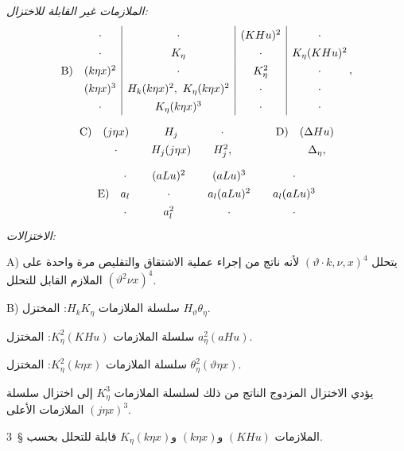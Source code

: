 \documentclass[11pt]{article}
\providecommand{\A}{\Delta}
\begin{document}
\noindent\emph{الملازمات غير القابلة للاختزال:}
\[
\renewcommand{\arraystretch}{1.35}
\begin{array}{@{}r@{\quad}c|c|c|c@{}}
&\cdot&\cdot&(KHu)^2&\cdot\\
&\cdot&K_\eta&\cdot&K_\eta(KHu)^2\\
\text{B)}&(k\eta x)^2&\cdot&K_\eta^2&\cdot\\
&(k\eta x)^3&H_k(k\eta x)^2,\ K_\eta(k\eta x)^2&\cdot&\cdot\\
&\cdot&K_\eta(k\eta x)^3&\cdot&\cdot
\end{array}\, ,
\]
\[
\renewcommand{\arraystretch}{1.35}
\begin{array}{@{}r@{\quad}c@{\qquad}c@{\qquad}c@{\qquad\qquad}r@{\quad}c@{}}
\text{C)}&(j\eta x)&H_j&\cdot&\text{D)}&(\A Hu)\\
&\cdot&H_j(j\eta x)&H_j^2,&&\A_\eta,
\end{array}
\]
\[
\renewcommand{\arraystretch}{1.35}
\begin{array}{@{}r@{\quad}c@{\qquad}c@{\qquad}c@{\qquad}c@{}}
&\cdot&(aLu)^2&(aLu)^3&\cdot\\
\text{E)}&a_l&\cdot&a_l(aLu)^2&a_l(aLu)^3\\
&\cdot&a_l^2&\cdot&\cdot
\end{array}
\]
\noindent\emph{الاختزالات:}

\noindent A) يتحلل $(\vartheta\cdot k,\nu,x)^4$ لأنه ناتج من إجراء عملية الاشتقاق والتقليص مرة واحدة على الملازم القابل للتحلل $(\vartheta^2\nu x)^4$.

\noindent B) سلسلة الملازمات $H_kK_\eta$: المختزل $H_\vartheta\theta_\eta$.

سلسلة الملازمات $K_\eta^2(KHu)$: المختزل $a_\eta^2(aHu)$.

سلسلة الملازمات $K_\eta^2(k\eta x)$: المختزل $\theta_\eta^2(\vartheta\eta x)$.

يؤدي الاختزال المزدوج الناتج من ذلك لسلسلة الملازمات $K_\eta^3$ إلى اختزال سلسلة الملازمات الأعلى $(j\eta x)^3$.

الملازمات $(KHu)$ و$(k\eta x)$ و$K_\eta(k\eta x)$ قابلة للتحلل بحسب \S\ 3.
\end{document}
